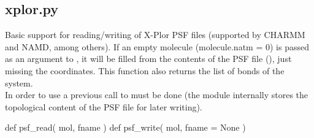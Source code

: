 \normalsize
\subsection[xplor]{xplor.py}
Basic support for reading/writing of X-Plor PSF files (supported by CHARMM and NAMD, among others).
If an empty molecule (molecule.natm = 0) is passed as an argument to , it will be filled from the contents of the PSF file (), just missing the coordinates. This function also returns the list of bonds of the system.\\
In order to use  a previous call to  must be done (the module internally stores the topological content of the PSF file for later writing).
\begin{pyglist}[language=python,fvset={frame=single}]
def psf_read( mol, fname )
def psf_write( mol, fname = None )
\end{pyglist}
